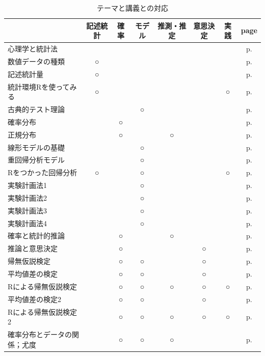 \documentclass[uplatex]{jsarticle}
\begin{document}
\begin{table}
    \caption{テーマと講義との対応}
    \label{processTable}
    \begin{tabular}[t]{lccccccc}
        & 記述統計 & 確率 & モデル & 推測・推定 & 意思決定 & 実践 & page \\\hline\hline
       心理学と統計法 &  &  &  &  &  &  &  p.\pageref{lesson01}\\
       数値データの種類 & ○ &  &  &  &  &  &  p.\pageref{lesson02}\\
       記述統計量 & ○ &  &  &  &  &  &  p.\pageref{lesson03}\\
       統計環境Rを使ってみる & ○ &  &  &  &  & ○ &  p.\pageref{lesson04}\\
       古典的テスト理論 &  &  & ○ &  &  &  &  p.\pageref{lesson05}\\
       確率分布 &  & ○ &  &  &  &  &  p.\pageref{lesson06}\\
       正規分布 &  & ○ &  & ○ &  &  &  p.\pageref{lesson07}\\
       線形モデルの基礎 &  &  & ○ &  &  &  &  p.\pageref{lesson08}\\
       重回帰分析モデル &  &  & ○ &  &  &  &  p.\pageref{lesson09}\\
       Rをつかった回帰分析 & ○ &  & ○ &  &  & ○ &  p.\pageref{lesson10}\\
       実験計画法1 &  &  & ○ &  &  &  &  p.\pageref{lesson11}\\
       実験計画法2 &  &  & ○ &  &  &  &  p.\pageref{lesson12}\\
       実験計画法3 &  &  & ○ &  &  &  &  p.\pageref{lesson13}\\
       実験計画法4 &  &  & ○ &  &  &  &  p.\pageref{lesson14}\\
       確率と統計的推論 &  & ○ &  & ○ &  &  &  p.\pageref{lesson16}\\
       推論と意思決定 &  & ○ &  &  & ○ &  &  p.\pageref{lesson17}\\
       帰無仮説検定 &  & ○ & ○ &  & ○ &  &  p.\pageref{lesson18}\\
       平均値差の検定 &  & ○ & ○ &  & ○ &  & p.\pageref{lesson19} \\
       Rによる帰無仮説検定 &  & ○ & ○ & ○ & ○ & ○ &  p.\pageref{lesson20}\\
       平均値差の検定2 &  & ○ & ○ &  & ○ &  &  p.\pageref{lesson21}\\
       Rによる帰無仮説検定2 &  & ○ & ○ & ○ & ○ & ○ &  p.\pageref{lesson22}\\
       確率分布とデータの関係；尤度 &  & ○ & ○ & ○ &  &  &  p.\pageref{lesson23}\\

\end{tabular}
\end{table}
\end{document}
